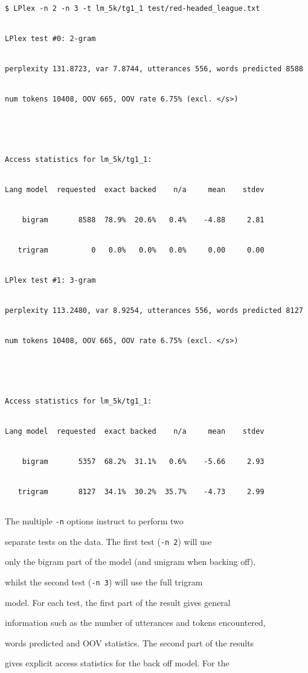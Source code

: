 \begin{verbatim}


$ LPlex -n 2 -n 3 -t lm_5k/tg1_1 test/red-headed_league.txt 


LPlex test #0: 2-gram


perplexity 131.8723, var 7.8744, utterances 556, words predicted 8588


num tokens 10408, OOV 665, OOV rate 6.75% (excl. </s>)





Access statistics for lm_5k/tg1_1:


Lang model  requested  exact backed    n/a     mean    stdev


    bigram       8588  78.9%  20.6%   0.4%    -4.88     2.81


   trigram          0   0.0%   0.0%   0.0%     0.00     0.00


LPlex test #1: 3-gram


perplexity 113.2480, var 8.9254, utterances 556, words predicted 8127


num tokens 10408, OOV 665, OOV rate 6.75% (excl. </s>)





Access statistics for lm_5k/tg1_1:


Lang model  requested  exact backed    n/a     mean    stdev


    bigram       5357  68.2%  31.1%   0.6%    -5.66     2.93


   trigram       8127  34.1%  30.2%  35.7%    -4.73     2.99


\end{verbatim} %


The multiple \texttt{-n} options instruct  to perform two


separate tests on the data. The first test (\texttt{-n 2}) will use


only the bigram part of the model (and unigram when backing off),


whilst the second test (\texttt{-n 3}) will use the full trigram


model. For each test, the first part of the result gives general


information such as the number of utterances and tokens encountered,


words predicted and OOV statistics.  The second part of the results


gives explicit access statistics for the back off model.  For the


